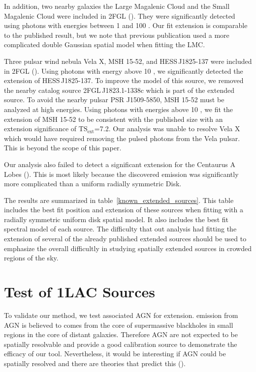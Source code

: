 \documentclass[12pt,preprint]{aastex}
\newcommand{\gev}{\text{GeV}\xspace}
\newcommand{\tsext}{{\ensuremath{\text{TS}_\text{ext}}}\xspace}
\begin{document}

In addition, two nearby galaxies the Large Magalenic Cloud and the
Small Magalenic Cloud were included in 2FGL (\cite{lmc,smc}).  They were
significantly detected using photons with energies between 1 \gev and
100 \gev. Our fit extension is comparable to the published result,
but we note that previous publication used a more complicated double
Gaussian spatial model when fitting the LMC.

Three pulsar wind nebula Vela X, MSH 15-52, and HESS\,J1825-137 were
included in 2FGL (\cite{velax,msh1552,fermi_hess_j1825}).  Using photons
with energy above 10 \gev, we significantly detected the extension of
HESS\,J1825-137.  To improve the model of this source, we removed the
nearby catalog source 2FGL\,J1823.1-1338c which is part of the extended
source.  To avoid the nearby pulsar PSR J1509-5850, MSH 15-52 must be
analyzed at high energies.  Using photons with energies above 10 \gev,
we fit the extension of MSH 15-52 to be consistent with the published
size with an extension significance of \tsext=7.2.  Our analysis was
unable to resolve Vela X which would have required removing the pulsed
photons from the Vela pulsar. This is beyond the scope of this paper.

Our analysis also failed to detect a significant extension for the
Centaurus A Lobes (\cite{cen_a_lat}). This is most likely because the
discovered emission was significantly more complicated than a uniform
radially symmetric Disk.  

The results are summarized in table~\ref{known_extended_sources}.
This table includes the best fit position and extension of these
sources when fitting with a radially symmetric uniform disk spatial
model.  It also includes the best fit spectral model of each source.
The difficulty that out analysis had fitting the extension of several
of the already published extended sources should be used to emphasize
the overall difficultly in studying spatially extended sources in crowded
regions of the sky.

\section{Test of 1LAC Sources}
\label{test_1lac_sources}

To validate our method, we test associated AGN for extension.  \gev
emission from AGN is believed to comes from the core of supermassive
blackholes in small regions in the core of distant galaxies. Therefore AGN
are not expected to be spatially resolvable and provide a good calibration
source to demonstrate the efficacy of our tool. Nevertheless, it would
be interesting if AGN could be spatially resolved and there are theories
that predict this (\cite{pair_halo_paper}).
\end{document}
